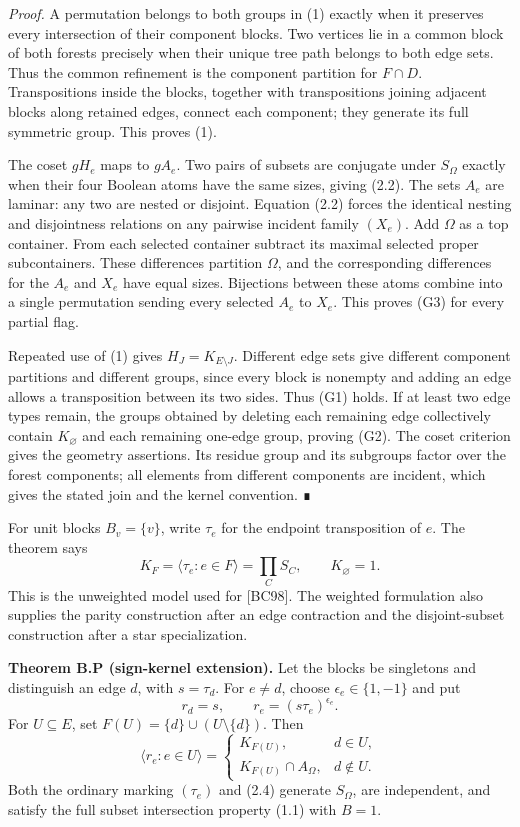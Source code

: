 \documentclass[
  11pt,
  a4paper,
]{article}
\begin{document}
\emph{Proof.} A permutation belongs to both groups in (1) exactly when
it preserves every intersection of their component blocks. Two vertices
lie in a common block of both forests precisely when their unique tree
path belongs to both edge sets. Thus the common refinement is the
component partition for \(F\cap D\). Transpositions inside the blocks,
together with transpositions joining adjacent blocks along retained
edges, connect each component; they generate its full symmetric group.
This proves (1).

The coset \(gH_e\) maps to \(gA_e\). Two pairs of subsets are conjugate
under \(S_\Omega\) exactly when their four Boolean atoms have the same
sizes, giving (2.2). The sets \(A_e\) are laminar: any two are nested or
disjoint. Equation (2.2) forces the identical nesting and disjointness
relations on any pairwise incident family \((X_e)\). Add \(\Omega\) as a
top container. From each selected container subtract its maximal
selected proper subcontainers. These differences partition \(\Omega\),
and the corresponding differences for the \(A_e\) and \(X_e\) have equal
sizes. Bijections between these atoms combine into a single permutation
sending every selected \(A_e\) to \(X_e\). This proves (G3) for every
partial flag.

Repeated use of (1) gives \(H_J=K_{E\setminus J}\). Different edge sets
give different component partitions and different groups, since every
block is nonempty and adding an edge allows a transposition between its
two sides. Thus (G1) holds. If at least two edge types remain, the
groups obtained by deleting each remaining edge collectively contain
\(K_\varnothing\) and each remaining one-edge group, proving (G2). The
coset criterion gives the geometry assertions. Its residue group and its
subgroups factor over the forest components; all elements from different
components are incident, which gives the stated join and the kernel
convention. ∎

For unit blocks \(B_v=\{v\}\), write \(\tau_e\) for the endpoint
transposition of \(e\). The theorem says \[
K_F=\langle\tau_e:e\in F\rangle
 =\prod_C S_C,\qquad K_\varnothing=1.
\tag{2.3}
\] This is the unweighted model used for {[}BC98{]}. The weighted
formulation also supplies the parity construction after an edge
contraction and the disjoint-subset construction after a star
specialization.

\textbf{Theorem B.P (sign-kernel extension).} Let the blocks be
singletons and distinguish an edge \(d\), with \(s=\tau_d\). For
\(e\ne d\), choose \(\epsilon_e\in\{1,-1\}\) and put \[
r_d=s,\qquad r_e=(s\tau_e)^{\epsilon_e}.
\tag{2.4}
\] For \(U\subseteq E\), set \(F(U)=\{d\}\cup(U\setminus\{d\})\). Then
\[
\langle r_e:e\in U\rangle=
\begin{cases}
K_{F(U)},&d\in U,\\
K_{F(U)}\cap A_\Omega,&d\notin U.
\end{cases}
\tag{2.5}
\] Both the ordinary marking \((\tau_e)\) and (2.4) generate
\(S_\Omega\), are independent, and satisfy the full subset intersection
property (1.1) with \(B=1\).
\end{document}

